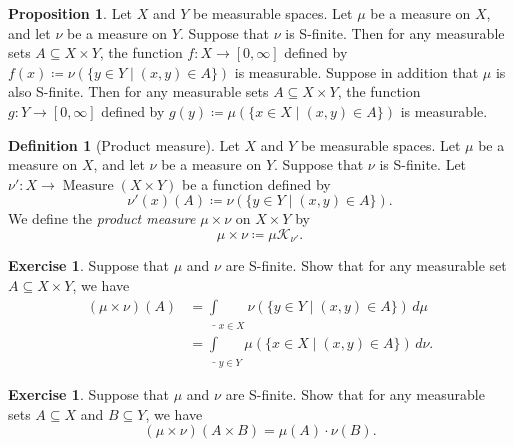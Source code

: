 \documentclass{article}
\theoremstyle{definition}
\newtheorem{proposition}[theorem]{Proposition}
\newtheorem{definition}[theorem]{Definition}
\newtheorem{exercise}[theorem]{Exercise}
\DeclareMathOperator{\Measure}{Measure}
\begin{document}
\begin{proposition}
  Let $X$ and $Y$ be measurable spaces.
  Let $\mu$ be a measure on $X$,
  and let $\nu$ be a measure on $Y$.
  Suppose that $\nu$ is S-finite.
  Then for any measurable sets $A \subseteq X \times Y$,
  the function $f : X \to [0, \infty]$ defined by
  $f (x) \coloneqq \nu (\{ y \in Y \mid (x,y) \in A \})$
  is measurable.
  Suppose in addition that $\mu$ is also S-finite.
  Then for any measurable sets $A \subseteq X \times Y$,
  the function $g : Y \to [0, \infty]$ defined by
  $g (y) \coloneqq \mu (\{ x \in X \mid (x,y) \in A \})$
  is measurable.
\end{proposition}

\begin{definition}[Product measure]
  Let $X$ and $Y$ be measurable spaces.
  Let $\mu$ be a measure on $X$,
  and let $\nu$ be a measure on $Y$.
  Suppose that $\nu$ is S-finite.
  Let $\nu' : X \to \Measure (X \times Y)$ be 
  a function defined by
  \begin{equation*}
    \nu' (x) (A) \coloneqq \nu (\{ y \in Y \mid (x,y) \in A \}).
  \end{equation*}
  We define the \emph{product measure} $\mu \times \nu$ on $X \times Y$ by
  \begin{equation*}
    \mu \times \nu \coloneqq \mu \mathcal{K}_{\nu'}.
  \end{equation*}
\end{definition}

\begin{exercise}
  Suppose that $\mu$ and $\nu$ are S-finite.
  Show that for any measurable set $A \subseteq X \times Y$,
  we have
  \begin{align*}
    (\mu \times \nu) (A) 
      &= \underline{\int}_{x \in X} \nu (\{ y \in Y \mid (x,y) \in A \}) \, d\mu \\
      &= \underline{\int}_{y \in Y} \mu (\{ x \in X \mid (x,y) \in A \}) \, d\nu.
  \end{align*}
\end{exercise}

\begin{exercise}
  Suppose that $\mu$ and $\nu$ are S-finite.
  Show that for any measurable sets $A \subseteq X$ and $B \subseteq Y$,
  we have
  \begin{equation*}
    (\mu \times \nu) (A \times B) = \mu (A) \cdot \nu (B).
  \end{equation*}
\end{exercise}
\end{document}
